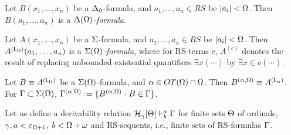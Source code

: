 \documentclass{article}
\begin{document}
\bdf\label{df:sigmaomeRS}
{\rm 
\benu
\item
Let $B(x_{1},\ldots,x_{n})$ be a $\Delta_{0}$-formula,
and $a_{1},\ldots,a_{n}\in RS$ be $|a_{i}|<\Omega$.
Then $B(a_{1},\ldots,a_{n})$ is a \textit{$\Delta(\Omega)$-formula}.

\item
Let $A(x_{1},\ldots,x_{n})$ be a $\Sigma$-formula,
and $a_{1},\ldots,a_{n}\in RS$ be $|a_{i}|<\Omega$.
Then $A^{({\sf L}_{\Omega})}(a_{1},\ldots,a_{n})$ is a \textit{$\Sigma(\Omega)$-formula},
where for RS-terms $c$,
$A^{(c)}$ denotes the result of replacing unbounded existential quantifiers
$\exi x(\cdots)$ by $\exi x\in c(\cdots)$.


\item
Let $B\equiv A^{({\sf L}_{\Omega})}$ be a $\Sigma(\Omega)$-formula, and 
$\alpha\in OT(\Omega)\cap\Omega$.
Then $B^{(\alpha,\Omega)}\equiv A^{({\sf L}_{\alpha})}$.
For $\Gamma\subset\Sigma(\Omega)$, $\Gamma^{(\alpha,\Omega)}:=\{B^{(\alpha,\Omega)}: B\in\Gamma\}$.

\eenu
}
\edf






Let us define a derivability relation ${\cal H}_{\gamma}[\Theta]\vdash^{a}_{b}\Gamma$ for 
finite sets $\Theta$ of ordinals, $\gamma,a<\varepsilon_{\Omega+1}$, $b<\Omega+\omega$ and 
RS-sequents, i.e., finite sets of RS-formulas $\Gamma$.
\end{document}
